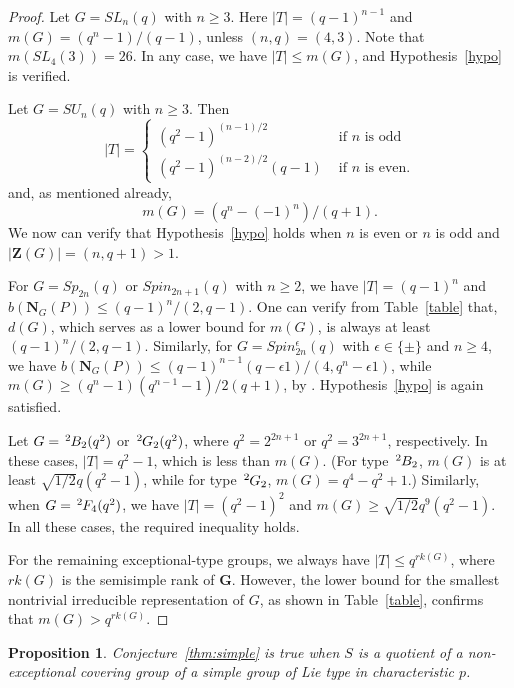 \documentclass[12pt]{amsart}
\theoremstyle{plain}
\newtheorem{pro}[thm]{Proposition}
\theoremstyle{definition}
\numberwithin{equation}{section}
\newcommand{\bG}{\mathbf{G}}
\newcommand{\bN}{\mathbf{N}}
\newcommand{\ta}{\hspace{0.5mm}^{2}\hspace*{-0.2mm}}
\newcommand{\bZ}{{\mathbf{Z}}}
\begin{document}
\begin{proof}
Let $G=SL_n(q)$ with $n\geq 3$. Here $|T|=(q-1)^{n-1}$ and
$m(G)=(q^n-1)/(q-1)$, unless $(n,q)=(4,3)$. Note that
$m(SL_4(3))=26$. In any case, we have $|T|\leq m(G)$, and
Hypothesis~\ref{hypo} is verified.

Let $G=SU_n(q)$ with $n\geq 3$. Then
\begin{equation*}
|T| = \begin{cases}
(q^2-1)^{(n-1)/2} &\text{ if } n \text{ is odd}\\
(q^2-1)^{(n-2)/2}(q-1) &\text{ if } n \text{ is even}.
\end{cases}
\end{equation*}
and, as mentioned already, \[m(G)=(q^n-(-1)^n)/(q+1).\] We now can
verify that Hypothesis~\ref{hypo} holds when $n$ is even or $n$ is
odd and $|\bZ(G)|=(n,q+1)> 1$.

For $G=Sp_{2n}(q)$ or $Spin_{2n+1}(q)$ with $n\geq 2$, we have
$|T|=(q-1)^n$ and $b(\bN_G(P))\leq (q-1)^n/(2,q-1)$. One can verify
from Table~\ref{table} that, $d(G)$, which serves as a lower bound
for $m(G)$, is always at least $(q-1)^n/(2,q-1)$. Similarly, for
$G=Spin_{2n}^\epsilon(q)$ with $\epsilon\in\{\pm\}$ and $n\geq 4$,
we have $b(\bN_G(P))\leq
(q-1)^{n-1}(q-\epsilon1)/(4,q^n-\epsilon1)$, while
$m(G)\geq(q^n-1)(q^{n-1}-1)/2(q+1)$, by \cite[Theorems~1.3 and
1.4]{Nguyen10}. Hypothesis~\ref{hypo} is again satisfied.


Let $G=\ta B_2(q^2)$ or $\ta G_2(q^2)$, where $q^2=2^{2n+1}$ or
$q^2=3^{2n+1}$, respectively. In these cases, $|T|=q^2-1$, which is
less than $m(G)$. (For type $\ta B_2$, $m(G)$ is at least
$\sqrt{1/2}q(q^2-1)$, while for type $\ta G_2$, $m(G)=q^4-q^2+1$.)
Similarly, when $G=\ta F_4(q^2)$, we have $|T|=(q^2-1)^2$ and
$m(G)\geq \sqrt{1/2}q^9(q^2-1)$. In all these cases, the required
inequality holds.

For the remaining exceptional-type groups, we always have $|T|\leq
q^{rk(G)}$, where $rk(G)$ is the semisimple rank of $\bG$. However,
the lower bound for the smallest nontrivial irreducible
representation of $G$, as shown in Table~\ref{table}, confirms that
$m(G)>q^{rk(G)}$.
\end{proof}

\begin{pro}
\label{prop:defining-char} Conjecture~\ref{thm:simple} is true when
$S$ is a quotient of a non-exceptional covering group of a simple
group of Lie type in characteristic $p$.
\end{pro}
\end{document}
